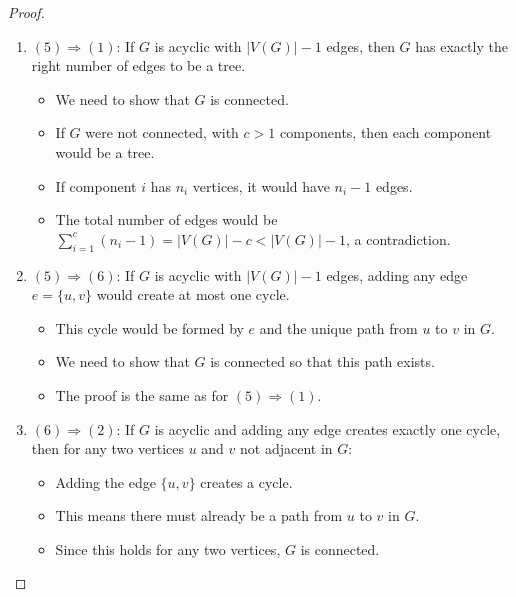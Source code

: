 \documentclass{article}
\theoremstyle{definition}
\begin{document}
\begin{proof}
\begin{enumerate}
    \item $(5) \Rightarrow (1)$: If $G$ is acyclic with $|V(G)| - 1$ edges, then $G$ has exactly the right number of edges to be a tree.
    \begin{itemize}
        \item We need to show that $G$ is connected.
        \item If $G$ were not connected, with $c > 1$ components, then each component would be a tree.
        \item If component $i$ has $n_i$ vertices, it would have $n_i - 1$ edges.
        \item The total number of edges would be $\sum_{i=1}^{c} (n_i - 1) = |V(G)| - c < |V(G)| - 1$, a contradiction.
    \end{itemize}
    
    \item $(5) \Rightarrow (6)$: If $G$ is acyclic with $|V(G)| - 1$ edges, adding any edge $e = \{u,v\}$ would create at most one cycle.
    \begin{itemize}
        \item This cycle would be formed by $e$ and the unique path from $u$ to $v$ in $G$.
        \item We need to show that $G$ is connected so that this path exists.
        \item The proof is the same as for $(5) \Rightarrow (1)$.
    \end{itemize}
    
    \item $(6) \Rightarrow (2)$: If $G$ is acyclic and adding any edge creates exactly one cycle, then for any two vertices $u$ and $v$ not adjacent in $G$:
    \begin{itemize}
        \item Adding the edge $\{u,v\}$ creates a cycle.
        \item This means there must already be a path from $u$ to $v$ in $G$.
        \item Since this holds for any two vertices, $G$ is connected.
    \end{itemize}
\end{enumerate}
\end{proof}
\end{document}
